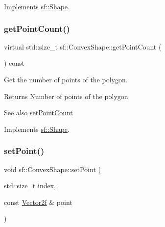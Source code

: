 Implements \hyperlink{classsf_1_1_shape_a40e5d83713eb9f0c999944cf96458085}{sf\+::\+Shape}.

\mbox{\label{classsf_1_1_convex_shape_a0c54b8d48fe4e13414f6e667dbfc22a3}} 
\subsubsection{\texorpdfstring{get\+Point\+Count()}{getPointCount()}}
{\footnotesize\ttfamily virtual std\+::size\+\_\+t sf\+::\+Convex\+Shape\+::get\+Point\+Count (\begin{DoxyParamCaption}{ }\end{DoxyParamCaption}) const\hspace{0.3cm}{\ttfamily [virtual]}}



Get the number of points of the polygon. 

\begin{DoxyReturn}{Returns}
Number of points of the polygon
\end{DoxyReturn}
\begin{DoxySeeAlso}{See also}
\hyperlink{classsf_1_1_convex_shape_a56e6e79ade6dd651cc1a0e39cb68deae}{set\+Point\+Count} 
\end{DoxySeeAlso}


Implements \hyperlink{classsf_1_1_shape_af988dd61a29803fc04d02198e44b5643}{sf\+::\+Shape}.

\mbox{\label{classsf_1_1_convex_shape_a5929e0ab0ba5ca1f102b40c234a8e92d}} 
\subsubsection{\texorpdfstring{set\+Point()}{setPoint()}}
{\footnotesize\ttfamily void sf\+::\+Convex\+Shape\+::set\+Point (\begin{DoxyParamCaption}\item[{std\+::size\+\_\+t}]{index,  }\item[{const \hyperlink{classsf_1_1_vector2}{Vector2f} \&}]{point }\end{DoxyParamCaption})}



